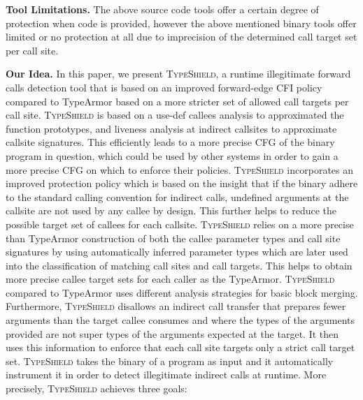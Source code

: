\textbf{Tool Limitations.}
The above source code tools offer a certain degree of protection when code is provided, however 
the above mentioned binary tools offer limited or no protection at all due to imprecision of 
the determined call target set per call site.

\textbf{Our Idea.}
In this paper, we present \textsc{TypeShield}, a runtime illegitimate forward 
calls detection tool that is based on an improved forward-edge CFI policy compared to TypeArmor based 
on a more stricter set of allowed call targets per call site.
\textsc{TypeShield} is based on a use-def callees analysis to approximated the function prototypes, 
and liveness analysis at indirect callsites to approximate callsite signatures. This 
efficiently leads to a more precise CFG of the binary program in question, 
which could be used by other systems in order to gain a more precise CFG on which to 
enforce their policies.
\textsc{TypeShield} incorporates an improved protection policy which is
based on the insight that if the binary adhere to the standard calling convention
for indirect calls, undefined arguments at the callsite are not used by any callee by design. 
This further helps to reduce the possible target set of callees for each callsite.
\textsc{TypeShield} relies on a more precise than TypeArmor construction of both the callee parameter types and call site signatures by 
using automatically inferred parameter types which are later used into the classification of matching call sites and call targets.
This helps to obtain more precise callee target sets for each caller as the TypeArmor.
\textsc{TypeShield} compared to TypeArmor uses different analysis strategies for basic block merging.
Furthermore, \textsc{TypeShield} disallows an indirect call transfer that prepares
fewer arguments than the target callee consumes and where the types of the 
arguments provided are not super types of the arguments expected at the target.
It then uses this information to enforce that each call site targets only a strict call target set.
\textsc{TypeShield} takes the binary of a program as input and it automatically instrument it in order
to detect illegitimate indirect calls at runtime. 
More precisely, \textsc{TypeShield} achieves three goals:
